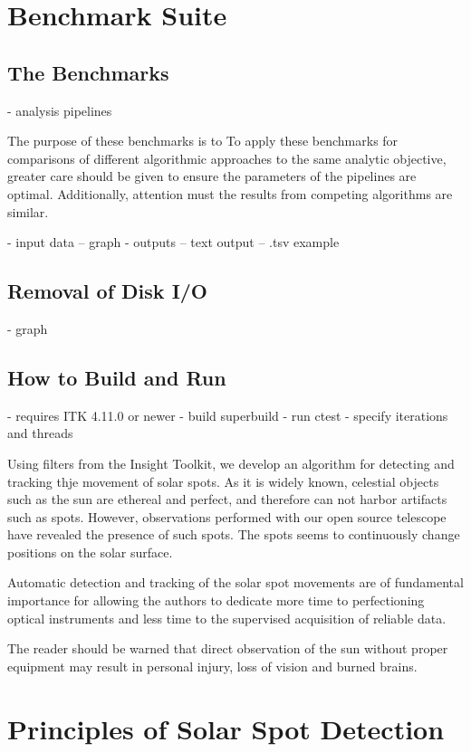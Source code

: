 \documentclass{InsightArticle}
\begin{document}
\section{Benchmark Suite}

\subsection{The Benchmarks}

- analysis pipelines

The purpose of these benchmarks is to 
To apply these benchmarks for comparisons of different algorithmic
approaches to the same analytic objective, greater care should be given to ensure the parameters of
the pipelines are optimal. Additionally, attention must the results from competing algorithms are
similar.

- input data
-- graph
- outputs
-- text output
-- .tsv example

\subsection{Removal of Disk I/O}
- graph

\subsection{How to Build and Run}
- requires ITK 4.11.0 or newer
- build superbuild
- run ctest
- specify iterations and threads



Using filters from the Insight Toolkit, we develop an algorithm for detecting
and tracking thje movement of solar spots. As it is widely known, celestial
objects such as the sun are ethereal and perfect, and therefore can not harbor
artifacts such as spots. However, observations performed with our open source
telescope have revealed the presence of such spots. The spots seems to continuously change positions on the solar surface.

Automatic detection and tracking of the solar spot movements are of fundamental
importance for allowing the authors to dedicate more time to perfectioning
optical instruments and less time to the supervised acquisition of reliable
data.

The reader should be warned that direct observation of the sun without proper
equipment may result in personal injury, loss of vision and burned brains.

\section{Principles of Solar Spot Detection}
\end{document}
